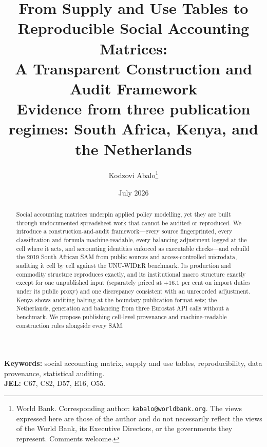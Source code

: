 \documentclass[11pt,a4paper]{article}
\title{From Supply and Use Tables to Reproducible Social Accounting
Matrices:\\ A Transparent Construction and Audit Framework\\
\large Evidence from three publication regimes: South Africa, Kenya,
and the Netherlands}
\author{Kodzovi Abalo\thanks{World Bank. Corresponding author:
\texttt{kabalo@worldbank.org}. The views expressed here are those
of the author and do not necessarily reflect the views of the World Bank,
its Executive Directors, or the governments they represent. Comments
welcome.}}
\date{July 2026}
\begin{document}
\maketitle

\begin{abstract}
\noindent
Social accounting matrices underpin applied policy modelling, yet they are
built through undocumented spreadsheet work that cannot be audited or
reproduced. We introduce a construction-and-audit framework---every source
fingerprinted, every classification and formula machine-readable, every
balancing adjustment logged at the cell where it acts, and accounting
identities enforced as executable checks---and rebuild the 2019 South
African SAM from public sources and access-controlled microdata, auditing
it cell by cell against the UNU-WIDER benchmark. Its production and
commodity structure reproduces exactly, and its institutional macro
structure exactly except for one unpublished input (separately priced at
$+16.1$ per cent on import duties under its public proxy) and one
discrepancy consistent with an unrecorded adjustment. Kenya shows auditing
halting at the
boundary publication format sets; the Netherlands, generation and balancing
from three Eurostat API calls without a benchmark. We propose publishing
cell-level provenance and machine-readable construction rules alongside
every SAM.
\end{abstract}

\vspace{0.5em}
\noindent\textbf{Keywords:} social accounting matrix, supply and use tables,
reproducibility, data provenance, statistical auditing.\\
\textbf{JEL:} C67, C82, D57, E16, O55.














\appendix

\end{document}
